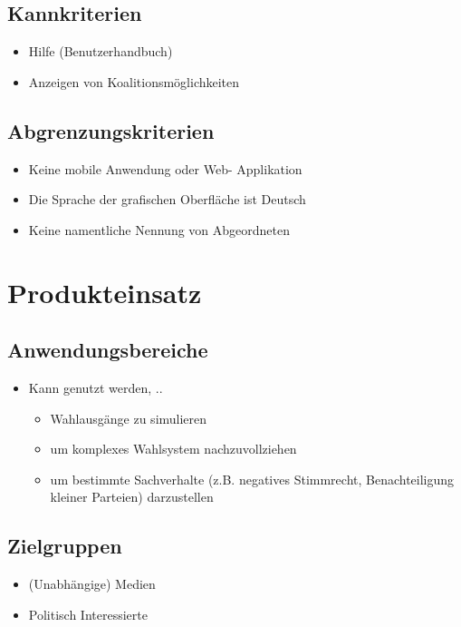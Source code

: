 \documentclass[10pt,a4paper]{article}
\begin{document}
\subsection{Kannkriterien}
\begin{itemize}
\item Hilfe (Benutzerhandbuch)
\item Anzeigen von Koalitionsmöglichkeiten
\end{itemize}


\subsection{Abgrenzungskriterien}
\begin{itemize}
\item Keine mobile Anwendung oder Web- Applikation
\item Die Sprache der grafischen Oberfläche ist Deutsch
\item Keine namentliche Nennung von Abgeordneten
\end{itemize}


\section{Produkteinsatz}
\subsection{Anwendungsbereiche}
\begin{itemize}
\item Kann genutzt werden, ..
\begin{itemize}
\item Wahlausgänge zu simulieren
\item um komplexes Wahlsystem nachzuvollziehen 
\item um bestimmte Sachverhalte (z.B. negatives Stimmrecht, Benachteiligung kleiner Parteien) darzustellen 
\end{itemize} 
\end{itemize}


\subsection{Zielgruppen}
\begin{itemize}
\item (Unabhängige) Medien
\item Politisch Interessierte
\end{itemize}
\end{document}
